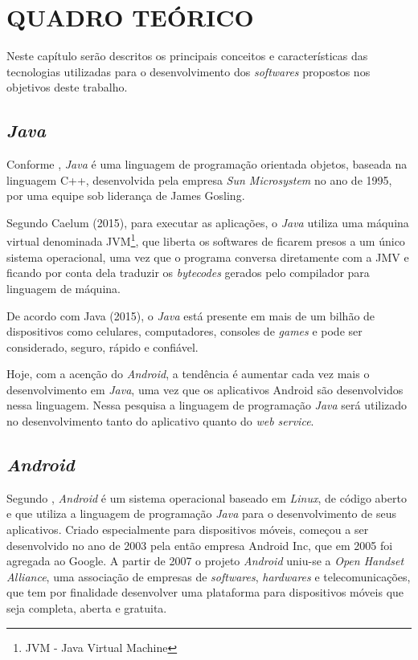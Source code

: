 \chapter{QUADRO TEÓRICO}

	\par Neste capítulo serão descritos os principais conceitos e características
das tecnologias utilizadas para o desenvolvimento dos \textit{softwares}
propostos nos objetivos deste trabalho.

\section{\textit{Java}}

	\par Conforme , \textit{Java} é uma linguagem de
programação orientada objetos, baseada na linguagem C++, desenvolvida pela
empresa \textit{Sun Microsystem} no ano de 1995, por uma equipe sob liderança
de James Gosling.

	\par Segundo Caelum (2015), para executar as aplicações, o \textit{Java}
utiliza uma máquina virtual denominada JVM\footnote{JVM - Java Virtual
Machine}, que liberta os softwares de ficarem presos a um único sistema
operacional, uma vez que o programa conversa diretamente com a JMV e ficando
por conta dela traduzir os \textit{bytecodes} gerados pelo compilador para
linguagem de máquina.

	\par De acordo com Java (2015), o \textit{Java} está presente em mais de um
bilhão de dispositivos como celulares, computadores, consoles de \textit{games}
e pode ser considerado, seguro, rápido e confiável.

	\par Hoje, com a acenção do \textit{Android}, a tendência é aumentar cada vez
mais o desenvolvimento em \textit{Java}, uma vez que os aplicativos Android são
desenvolvidos nessa linguagem. Nessa pesquisa a linguagem de programação
\textit{Java} será utilizado no desenvolvimento tanto do aplicativo quanto do
\textit{web service}.

\section{\textit{Android}}

	\par Segundo , \textit{Android} é um sistema
operacional baseado em \textit{Linux}, de código aberto e que utiliza a
linguagem de programação \textit{Java} para o desenvolvimento de seus
aplicativos. Criado especialmente para dispositivos móveis, começou a
ser desenvolvido no ano de 2003 pela então empresa Android Inc, que em 2005 foi
agregada ao Google. A partir de 2007 o projeto \textit{Android} uniu-se a
\textit{Open Handset Alliance}, uma associação de empresas de
\textit{softwares}, \textit{hardwares} e telecomunicações, que tem por
finalidade desenvolver uma plataforma para dispositivos móveis que seja
completa, aberta e gratuita.

